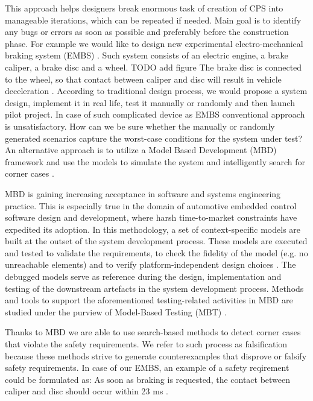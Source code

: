 This approach helps designers break enormous task of creation of CPS into manageable iterations, which can be repeated if needed. Main goal is to identify any bugs or errors as soon as possible and preferably before the construction phase. For example we would like to design new experimental electro-mechanical braking system (EMBS) . Such system consists of an electric engine, a brake caliper, a brake disc and a wheel. TODO add figure The brake disc is connected to the wheel, so that contact between caliper and disc will result in vehicle deceleration \cite{Oehlerking:EMBS}. According to traditional design process, we would propose a system design, implement it in real life, test it manually or randomly and then launch pilot project. In case of such complicated device as EMBS conventional approach is unsatisfactory. How can we be sure whether the manually or randomly generated scenarios capture the worst-case conditions for the system under test? An alternative approach is to utilize a Model Based Development (MBD) framework and use the models to simulate the system and intelligently search for corner cases \cite{Fainekos:testCaseGeneration}.

MBD is gaining increasing acceptance in software and systems engineering practice. This is especially true in the domain of automotive embedded control software design and development, where harsh time-to-market constraints have expedited its adoption. In this methodology, a set of context-specific models are built at the outset of the system development process. These models are executed and tested to validate the requirements, to check the fidelity of the model (e.g. no unreachable elements) and to verify platform-independent design choices \cite{Mohalik:ModelCheckingSimulink}. The debugged models serve as reference during the design, implementation and testing of the downstream artefacts in the system development process. Methods and tools to support the aforementioned testing-related activities in MBD are studied under the purview of Model-Based Testing (MBT) \cite{Dalal:MBT}.

Thanks to MBD we are able to use search-based methods to detect corner cases that violate the safety requirements. We refer to such process as falsification because these methods strive to generate counterexamples that disprove or falsify safety requirements. In case of our EMBS, an example of a safety reqirement could be formulated as: As soon as braking is requested, the contact between caliper and disc should occur within 23 ms \cite{Oehlerking:EMBS}.

